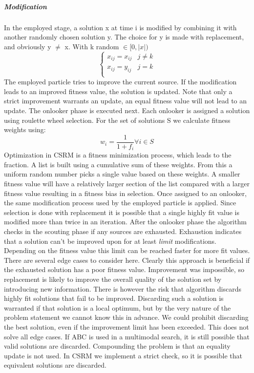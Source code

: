 \subparagraph{Modification}
In the employed stage, a solution x at time i is modified by combining it with another randomly chosen solution y. The choice for y is made with replacement, and obviously y $\neq$ x.
With k random $\in [0, \vert x \vert)$
\[   \left\{
\begin{array}{ll}
      x_{ij} = x_{ij} & j \neq k \\
      x_{ij} = y_{ij} & j = k \\
\end{array} 
\right.
\]
The employed particle tries to improve the current source. If the modification leads to an improved fitness value, the solution is updated. Note that only a strict improvement warrants an update, an equal fitness value will not lead to an update. 
The onlooker phase is executed next. Each onlooker is assigned a solution using roulette wheel selection.
For the set of solutions S we calculate fitness weights using:
\[
w_i = \frac{1}{1 + f_i} \forall i \in S 
\]
Optimization in CSRM is a fitness minimization process, which leads to the fraction. A list is built using a cumulative sum of these weights. From this a uniform random number picks a single value based on these weights. A smaller fitness value will have a relatively larger section of the list compared with a larger fitness value resulting in a fitness bias in selection. 
Once assigned to an onlooker, the same modification process used by the employed particle is applied. Since selection is done with replacement it is possible that a single highly fit value is modified more than twice in an iteration. 
After the onlooker phase the algorithm checks in the scouting phase if any sources are exhausted. Exhaustion indicates that a solution can't be improved upon for at least \textit{limit} modifications. Depending on the fitness value this limit can be reached faster for more fit values. There are several edge cases to consider here. Clearly this approach is beneficial if the exhausted solution has a poor fitness value. Improvement was impossible, so replacement is likely to improve the overall quality of the solution set by introducing new information. There is however the risk that algorithm discards highly fit solutions that fail to be improved. Discarding such a solution is warranted if that solution is a local optimum, but by the very nature of the problem statement we cannot know this in advance. We could prohibit discarding the best solution, even if the improvement limit has been exceeded. This does not solve all edge cases. If ABC is used in a multimodal search, it is still possible that valid solutions are discarded. Compounding the problem is that an equality update is not used. In CSRM we implement a strict check, so it is possible that equivalent solutions are discarded. 
